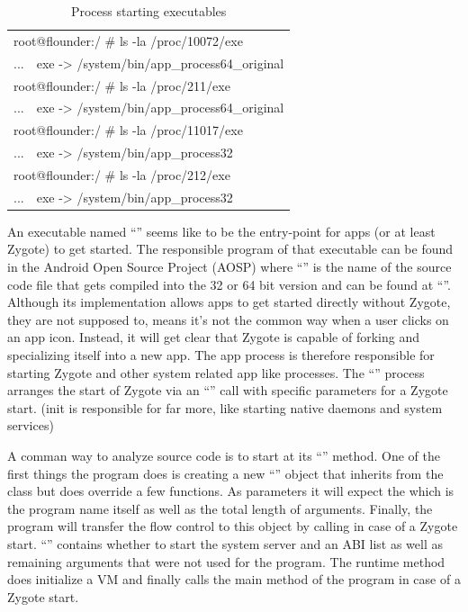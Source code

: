 \begin{table}[htb]
  \caption[Process Executables]{Process starting executables}
  \label{tab:process_executables}
  \centering
  \begin{tabular}{l l}
    \toprule
    \multicolumn{2}{l}{root@flounder:/ \# ls -la /proc/10072/exe} \\
    ... & exe -> /system/bin/app\_process64\_original\\
    \midrule
    \multicolumn{2}{l}{root@flounder:/ \# ls -la /proc/211/exe} \\
    ... & exe -> /system/bin/app\_process64\_original\\
    \midrule
    \multicolumn{2}{l}{root@flounder:/ \# ls -la /proc/11017/exe} \\
    ... & exe -> /system/bin/app\_process32\\
    \midrule
    \multicolumn{2}{l}{root@flounder:/ \# ls -la /proc/212/exe} \\
    ... & exe -> /system/bin/app\_process32\\
    \bottomrule
  \end{tabular}
\end{table}

An executable named ``'' seems like to be the entry-point for apps (or at least Zygote) to get started.
The responsible program of that executable
can be found in the Android Open Source Project (AOSP) where
``'' is the name of the source code file that gets
compiled into the 32 or 64 bit version
and can be found at ``''.
Although its implementation allows apps to get started directly without
Zygote, they are not supposed to, means it's not the common way
when a user clicks on an app icon. Instead, it will get clear that Zygote
is capable of forking and specializing itself into a new app.
The app process is therefore responsible for starting Zygote and other system
related app like processes.
The ``'' process arranges the start of Zygote via an
``'' call with specific parameters for a Zygote start.
(init is responsible for far more, like starting native daemons and system services)

A comman way to analyze source code is to start at its
``'' method.
One of the first things the program does is
creating a new ``'' object that inherits from the
 class but does override a few functions. As parameters it will expect the 
which is the program name itself as well as the total length of arguments.
Finally, the program will transfer the flow control to this object by calling
 in case of a
Zygote start.
``'' contains whether to start the system server and an ABI
list as well as remaining arguments that were not used for the  program. The runtime  method does initialize
a VM and finally calls the main method of the 
program in case of a Zygote start.

